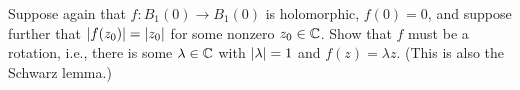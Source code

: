 \documentclass{homework}
\begin{document}
                                                                                                                                                                                                                                                                  \begin{problem}\label{schwarz-lemma-2}Suppose again that $f : B_1(0) \to B_1(0)$ is holomorphic, $f(0) = 0$, and
                                                                                                                                                                                                                                                                    suppose further that $\left|f(z_0)\right| = \left|z_0\right|$ for some nonzero
                                                                                                                                                                                                                                                                      $z_0 \in \mathbb{C}$.  Show that $f$ must be a rotation, i.e., there is some
                                                                                                                                                                                                                                                                        $\lambda \in \mathbb{C}$ with $\left|\lambda\right| = 1$ and $f(z) = \lambda z$.
                                                                                                                                                                                                                                                                          (This is also the Schwarz lemma.)
                                                                                                                                                                                                                                                                          \end{problem}
\end{document}
